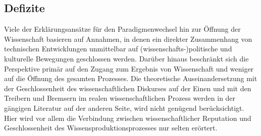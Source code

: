 \subsection{Defizite}
Viele der Erklärungsansätze für den Paradigmenwechsel hin zur Öffnung der Wissenschaft basieren auf Annahmen, in denen ein direkter Zusammenhang von technischen Entwicklungen unmittelbar auf (wissenschafts-)politische und kulturelle Bewegungen geschlossen werden. Darüber hinaus beschränkt sich die Perspektive primär auf den Zugang zum Ergebnis von Wissenschaft und weniger auf die Öffnung des gesamten Prozesses. Die theoretische Auseinandersetzung mit der Geschlossenheit des wissenschaftlichen Diskurses  auf der Einen und mit den Treibern und Bremsern im realen wissenschaftlichen Prozess werden in der gängigen Literatur auf der anderen Seite, wird nicht genügend berücksichtigt. Hier wird vor allem die Verbindung zwischen wissenschaftlicher Reputation und Geschlossenheit des Wissensproduktionsprozesses nur selten erörtert.